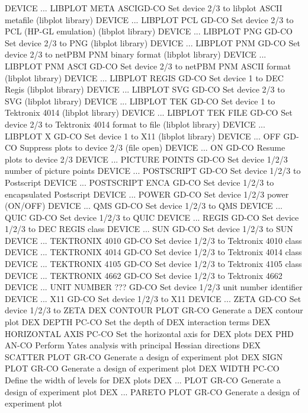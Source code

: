 DEVICE ... LIBPLOT META ASCIGD-CO Set device 2/3 to libplot ASCII metafile (libplot library)
DEVICE ... LIBPLOT PCL      GD-CO Set device 2/3 to PCL (HP-GL emulation) (libplot library)
DEVICE ... LIBPLOT PNG      GD-CO Set device 2/3 to PNG (libplot library)
DEVICE ... LIBPLOT PNM      GD-CO Set device 2/3 to netPBM PNM binary format (libplot library)
DEVICE ... LIBPLOT PNM ASCI GD-CO Set device 2/3 to netPBM PNM ASCII format (libplot library)
DEVICE ... LIBPLOT REGIS    GD-CO Set device 1 to DEC Regis (libplot library)
DEVICE ... LIBPLOT SVG      GD-CO Set device 2/3 to SVG (libplot library)
DEVICE ... LIBPLOT TEK      GD-CO Set device 1 to Tektronix 4014 (libplot library)
DEVICE ... LIBPLOT TEK FILE GD-CO Set device 2/3 to Tektronix 4014 format to file (libplot library)
DEVICE ... LIBPLOT X        GD-CO Set device 1 to X11 (libplot library)
DEVICE ... OFF              GD-CO Suppress plots to device 2/3 (file open)
DEVICE ... ON               GD-CO Resume plots to device 2/3 
DEVICE ... PICTURE POINTS   GD-CO Set device 1/2/3 number of picture points
DEVICE ... POSTSCRIPT       GD-CO Set device 1/2/3 to Postscript
DEVICE ... POSTSCRIPT ENCA  GD-CO Set device 1/2/3 to encapsulated Postscript
DEVICE ... POWER            GD-CO Set device 1/2/3 power (ON/OFF)
DEVICE ... QMS              GD-CO Set device 1/2/3 to QMS
DEVICE ... QUIC             GD-CO Set device 1/2/3 to QUIC
DEVICE ... REGIS            GD-CO Set device 1/2/3 to DEC REGIS class
DEVICE ... SUN              GD-CO Set device 1/2/3 to SUN
DEVICE ... TEKTRONIX 4010   GD-CO Set device 1/2/3 to Tektronix 4010 class
DEVICE ... TEKTRONIX 4014   GD-CO Set device 1/2/3 to Tektronix 4014 class
DEVICE ... TEKTRONIX 4105   GD-CO Set device 1/2/3 to Tektronix 4105 class
DEVICE ... TEKTRONIX 4662   GD-CO Set device 1/2/3 to Tektronix 4662
DEVICE ... UNIT NUMBER ???  GD-CO Set device 1/2/3 unit number identifier
DEVICE ... X11              GD-CO Set device 1/2/3 to X11
DEVICE ... ZETA             GD-CO Set device 1/2/3 to ZETA
DEX CONTOUR PLOT            GR-CO Generate a DEX contour plot
DEX DEPTH                   PC-CO Set the depth of DEX interaction terms
DEX HORIZONTAL AXIS         PC-CO Set the horizontal axis for DEX plots
DEX PHD                     AN-CO Perform Yates analysis with principal Hessian directions
DEX SCATTER PLOT            GR-CO Generate a design of experiment plot
DEX SIGN PLOT               GR-CO Generate a design of experiment plot
DEX WIDTH                   PC-CO Define the width of levels for DEX plots
DEX ... PLOT                GR-CO Generate a design of experiment plot
DEX ... PARETO PLOT         GR-CO Generate a design of experiment plot
